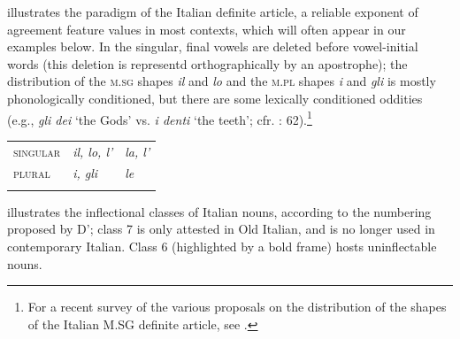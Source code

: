\documentclass[output=paper]{langscibook}
\begin{document}
 illustrates the paradigm of the Italian definite article, a reliable exponent of agreement feature values in most contexts, which will often appear in our examples below. In the singular, final vowels are deleted before vowel-initial words (this deletion is representd orthographically by an apostrophe); the distribution of the \textsc{m.sg} shapes \textit{il} and \textit{lo} and the \textsc{m.pl} shapes \textit{i} and \textit{gli} is mostly phonologically conditioned, but there are some lexically conditioned oddities (e.g., \textit{gli dei} ‘the Gods’ vs. \textit{i denti} ‘the teeth’; cfr. \citealt{MaidenRobustelli2000}: 62).\footnote{For a recent survey of the various proposals on the distribution of the shapes of the Italian M.SG definite article, see \citet{Repetti2020}.}

\begin{stylelsTable}%
\begin{table}
\caption{Forms and shapes of the Italian definite article}
\label{tab:key:1}
\end{table}\end{stylelsTable}


\begin{tabularx}{\textwidth}{XXX}

\lsptoprule
\textsc{singular} & \textit{il, lo, l’} & \textit{la, l’}\\
\textsc{plural} & \textit{i, gli} & \textit{le}\\
\lspbottomrule
\end{tabularx}
 illustrates the inflectional classes of Italian nouns, according to the numbering proposed by D’\citet{AchilleThornton2003}; class 7 is only attested in Old Italian, and is no longer used in contemporary Italian. Class 6 (highlighted by a bold frame) hosts uninflectable nouns.

\begin{stylelsTable}%
\begin{table}
\caption{Inflectional classes of Italian nouns}
\label{tab:key:2}
\end{table}\end{stylelsTable}
\end{document}
